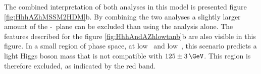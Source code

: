 The combined interpretation of both analyses in this model is presented figure 
\ref{fig:HhhAZhMSSM2HDM}b.
By combining the two analyses a slightly larger amount
of the \mA-\tanb~plane can be excluded than using the \AtoZhtolltautau analysis alone. The features
described for the figure \ref{fig:HhhAndAZhlowtanb}b are also visible in this figure. In a small region of phase
space, at low \mA~and low~\tanb, this scenario predicts a light Higgs boson mass that is not compatible with $125\pm3\,\GeV$.
This region is therefore excluded, as indicated by the red band. 



